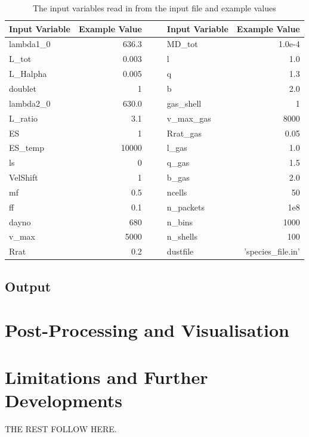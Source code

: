 	
	\begin{table}[htdp]
\caption{The input variables read in from the input file and example values}
\begin{center}
\begin{tabular}{l r c|c l r}
\hline
Input Variable & Example Value &&& Input Variable & Example Value\\
\hline
lambda1\_0 & 636.3 &&& MD\_tot & 1.0e-4\\
L\_tot & 0.003 &&& l & 1.0\\
L\_Halpha & 0.005 &&& q & 1.3\\
doublet & 1 &&& b & 2.0\\
lambda2\_0 & 630.0 &&& gas\_shell & 1\\
L\_ratio & 3.1&&& v\_max\_gas & 8000\\
ES & 1 &&& Rrat\_gas & 0.05\\
ES\_temp & 10000 &&& l\_gas & 1.0\\
ls & 0 &&& q\_gas & 1.5\\
VelShift & 1 &&& b\_gas & 2.0\\
mf & 0.5 &&& ncells & 50\\
ff & 0.1 &&& n\_packets & 1e8\\
dayno & 680 &&& n\_bins & 1000\\
v\_max & 5000 &&& n\_shells & 100\\
Rrat & 0.2 &&& dustfile & 'species\_file.in'\\
\hline
\end{tabular}
\end{center}
\label{default}
\end{table}%
	
	\subsection{Output}
\section{Post-Processing and Visualisation}
\section{Limitations and Further Developments}
\label{limitations}

\clearpage
		


THE REST FOLLOW HERE. 


